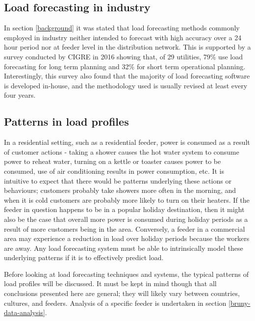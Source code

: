 \subsection{Load forecasting in industry}
In section \ref{background} it was stated that load forecasting methods commonly employed in industry neither intended to forecast with high accuracy over a 24 hour period nor at feeder level in the distribution network.
This is supported by a survey conducted by CIGRE in 2016 \citep{CIGRE2016} showing that, of 29 utilities, 79\% use load forecasting for long term planning and 32\% for short term operational planning.
Interestingly, this survey also found that the majority of load forecasting software is developed in-house, and the methodology used is usually revised at least every four years.


\subsection{Patterns in load profiles}
\label{patterns-profiles}
In a residential setting, such as a residential feeder, power is consumed as a result of customer actions - taking a shower causes the hot water system to consume power to reheat water, turning on a kettle or toaster causes power to be consumed, use of air conditioning results in power consumption, etc.
It is intuitive to expect that there would be patterns underlying these actions or behaviours; customers probably take showers more often in the morning, and when it is cold customers are probably more likely to turn on their heaters.
If the feeder in question happens to be in a popular holiday destination, then it might also be the case that overall more power is consumed during holiday periods as a result of more customers being in the area.
Conversely, a feeder in a commercial area may experience a reduction in load over holiday periods because the workers are away.
Any load forecasting system must be able to intrinsically model these underlying patterns if it is to effectively predict load.

Before looking at load forecasting techniques and systems, the typical patterns of load profiles will be discussed.
It must be kept in mind though that all conclusions presented here are general; they will likely vary between countries, cultures, and feeders.
Analysis of a specific feeder is undertaken in section \ref{bruny-data-analysis}.

